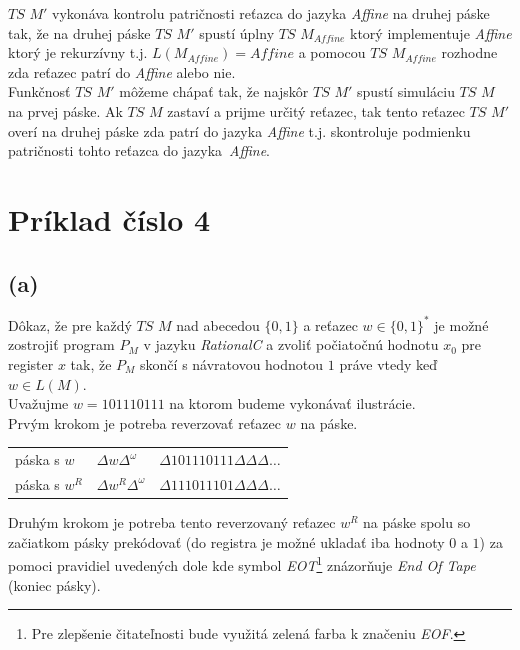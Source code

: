 \documentclass[11pt,a4paper]{article}
\newcommand{\green}[1]{\textcolor{OliveGreen}{#1}}
\begin{document}
$TS$ $M'$ vykonáva kontrolu patričnosti reťazca do jazyka \textit{Affine} na druhej páske tak, že na druhej páske $TS$ $M'$ spustí úplny $TS$ $M_{Affine}$ ktorý implementuje \textit{Affine} ktorý je rekurzívny t.j. $L(M_{Affine}) = Affine$ a pomocou $TS$ $M_{Affine}$ rozhodne zda reťazec patrí do \textit{Affine} alebo nie.\\

Funkčnosť $TS$ $M'$ môžeme chápať tak, že najskôr $TS$ $M'$ spustí simuláciu $TS$ $M$ na prvej páske. Ak $TS$ $M$ zastaví a prijme určitý reťazec, tak tento reťazec $TS$ $M'$ overí na druhej páske zda patrí do jazyka \textit{Affine} t.j. skontroluje podmienku patričnosti tohto reťazca do jazyka \textit{Affine}.

\newpage
\section{Príklad číslo 4} %

\subsection{(a)}
Dôkaz, že pre každý $TS$ $M$ nad abecedou $\{0,1\}$ a reťazec $w \in \{0,1\}^*$ je možné zostrojiť program $P_M$ v jazyku \textit{RationalC} a zvoliť počiatočnú hodnotu $x_0$ pre register $x$ tak, že $P_M$ skončí s návratovou hodnotou $1$ práve vtedy keď $w \in L(M)$.\\

Uvažujme $w = 1 0 1 1 1 0 1 1 1$ na ktorom budeme vykonávať ilustrácie.\\

Prvým krokom je potreba reverzovať reťazec $w$ na páske.

\begin{center}
    \begin{tabular}{l|l|l}
        páska s $w$   & $\Delta w   \Delta^\omega$ & $\Delta 1 0 1 1 1 0 1 1 1 \Delta \Delta \Delta \dots$\\
        páska s $w^R$ & $\Delta w^R \Delta^\omega$ & $\Delta 1 1 1 0 1 1 1 0 1 \Delta \Delta \Delta \dots$\\
    \end{tabular}
\end{center}

Druhým krokom je potreba tento reverzovaný reťazec $w^R$ na páske spolu so začiatkom pásky prekódovať (do registra je možné ukladať iba hodnoty $0$ a $1$) za pomoci pravidiel uvedených dole kde symbol \green{\textit{EOT}}\footnote{Pre zlepšenie čitateľnosti bude využitá zelená farba k značeniu \textit{EOF}.} znázorňuje \textit{End Of Tape} (koniec pásky).
\end{document}
